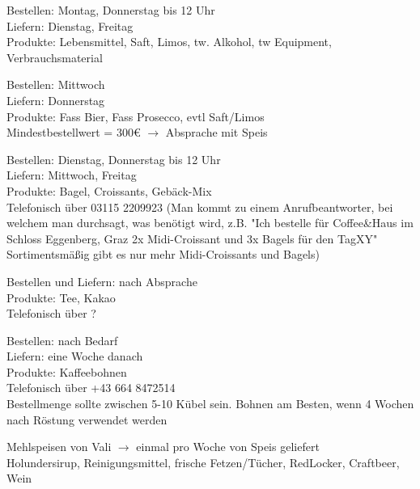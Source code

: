 \documentclass[a4paper,12pt]{article}
\newcounter{row}
\begin{document}
\vspace{1em}

\begin{description}[style=nextline]
    \item[Transgourmet:]
    Bestellen: Montag, Donnerstag bis 12 Uhr \\
    Liefern: Dienstag, Freitag \\
    Produkte: Lebensmittel, Saft, Limos, tw. Alkohol, tw Equipment, Verbrauchsmaterial

    \item[Brauunion:]
    Bestellen: Mittwoch \\
    Liefern: Donnerstag \\
    Produkte: Fass Bier, Fass Prosecco, evtl Saft/Limos \\
    Mindestbestellwert = 300€ $\longrightarrow$ Absprache mit Speis

    \item[Resch\&Frisch:]

    Bestellen: Dienstag, Donnerstag bis 12 Uhr \\
    Liefern: Mittwoch, Freitag\\
    Produkte: Bagel, Croissants, Gebäck-Mix\\
    Telefonisch über 03115 2209923 (Man kommt zu einem Anrufbeantworter, bei welchem man durchsagt, was benötigt wird, z.B. "Ich bestelle für Coffee\&Haus im Schloss Eggenberg, Graz 2x Midi-Croissant und 3x Bagels für den TagXY" Sortimentsmäßig gibt es nur mehr Midi-Croissants und Bagels)

    \item[Pure Tee:]
    Bestellen und Liefern: nach Absprache \\
    Produkte: Tee, Kakao \\
    Telefonisch über ?

    \item[Paul\&Bohne:]
    Bestellen: nach Bedarf \\
    Liefern: eine Woche danach \\
    Produkte: Kaffeebohnen \\
    Telefonisch über +43 664 8472514 \\
    Bestellmenge sollte zwischen 5-10 Kübel sein. Bohnen am Besten, wenn 4 Wochen nach Röstung verwendet werden

    \item[aus Speis:]
    Mehlspeisen von Vali $\rightarrow$ einmal pro Woche von Speis geliefert \\
    Holundersirup, Reinigungsmittel, frische Fetzen/Tücher, RedLocker, Craftbeer, Wein
\end{description}
\end{document}
